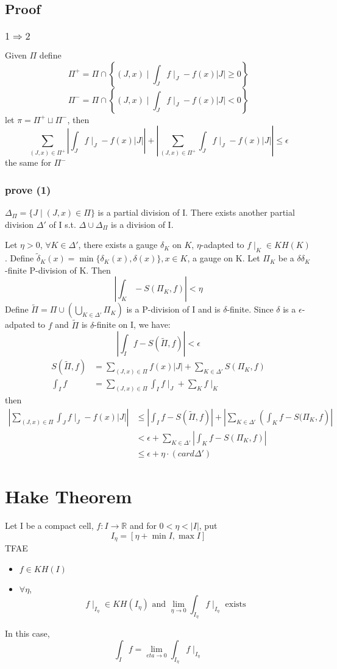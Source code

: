 \documentclass{book}
\newcommand{\abs}[1]{\left\lvert #1 \right\rvert}
\begin{document}
\subsection*{Proof}
\subsubsection{$1\Rightarrow2$}
Given $\Pi$ define
$$\Pi^+=\Pi\cap\left\{(J,x)\mid\int_Jf\mid_J-f(x)\abs J\geq 0\right\}$$
$$\Pi^-=\Pi\cap\left\{(J,x)\mid\int_Jf\mid_J-f(x)\abs J<0\right\}$$
let $\pi=\Pi^+\sqcup\Pi^-$, then 
$$\sum\limits_{(J,x)\in \Pi^+}\abs{\int_Jf\mid_J-f(x)\abs J}+\abs{\sum\limits_{(J,x)\in \Pi^+}\int_Jf\mid_J-f(x)\abs J}\leq\epsilon$$
the same for $\Pi^-$
\subsubsection{prove (1)}
$\Delta_\Pi=\{J\mid(J,x)\in \Pi\}$ is a partial division of I. There exists another partial division $\Delta'$ of I s.t. $\Delta\cup\Delta_\Pi$ is a division of I.

Let $\eta>0$, $\forall K\in \Delta'$, there exists a gauge $\delta_K$ on $K$, $\eta$-adapted to $f\mid_K\in KH(K)$. Define $\tilde\delta_K(x)=\min\{\delta_K(x),\delta(x)\},x\in K$, a gauge on K. Let $\Pi_K$ be a $\delta\delta_K$-finite P-division of K. Then
$$\abs{\int_K-S(\Pi_K,f)}<\eta$$
Define $\tilde\Pi=\Pi\cup\left(\bigcup\limits_{K\in \Delta'}\Pi_K\right)$ is a P-division of I and is $\delta$-finite. Since $\delta$ is a $\epsilon$-adpated to $f$ and $\tilde\Pi$ is $\delta$-finite on I, we have:
$$\abs{\int_If-S(\tilde\Pi,f)}<\epsilon$$
$$\begin{aligned}
    S(\tilde\Pi,f)&=\sum\limits_{(J,x)\in \Pi}f(x)\abs J+\sum\limits_{K\in \Delta'}S(\Pi_K,f)\\
    \int_If&=\sum\limits_{(J,x)\in \Pi}\int_If\mid_J+\sum\limits_Kf\mid_K
\end{aligned}$$then
$$\begin{aligned}
    \abs{\sum\limits_{(J,x)\in \Pi}\int_Jf\mid_J-f(x)\abs J}&\leq\abs{\int_If-S(\tilde\Pi,f)}+\abs{\sum\limits_{K\in \Delta'}\left(\int_Kf-S(\Pi_K,f\right)}\\
    &<\epsilon+\sum\limits_{K\in \Delta'}\abs{\int_Kf-S(\Pi_K,f)}\\
    &\leq\epsilon+\eta\cdot(card\Delta')
\end{aligned}$$
\section{Hake Theorem}
\label{Hake Theorem}
Let I be a compact cell, $f:I\rightarrow\mathbb R$ and for $0<\eta<\abs I$, put $$I_\eta=[\eta+\min I,\max I]$$
TFAE
\begin{itemize}
    \item $f\in KH(I)$
    \item $\forall\eta$,$$f\mid_{I_\eta}\in KH(I_\eta)\text{ and }\lim\limits_{\eta\rightarrow0}\int_{I_\eta}f\mid_{I_\eta}\text{ exists}$$
\end{itemize}
In this case, $$\int_If=\lim\limits_{eta\rightarrow0}\int_{I_\eta}f\mid_{I_\eta}$$
\end{document}
